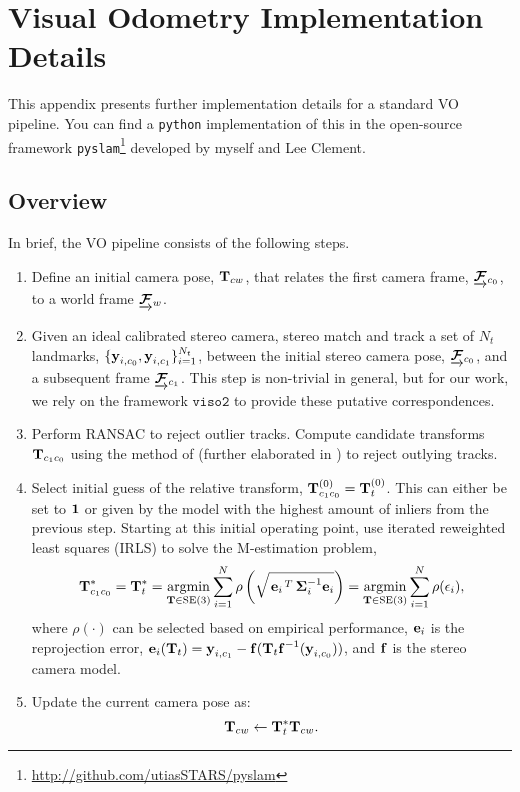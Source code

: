 \chapter{Visual Odometry Implementation Details}
\label{chap:appendix_vo}

This appendix presents further implementation details for a standard VO pipeline. You can find a \texttt{python} implementation of this in the open-source framework \texttt{pyslam}\footnote{\url{http://github.com/utiasSTARS/pyslam}} developed by myself and Lee Clement. 

\section{Overview}
In brief, the VO pipeline consists of the following steps.
\begin{enumerate}
\item Define an initial camera pose, $\boldsymbol{\mathbf{T}}_{cw}$, that relates the first camera frame, $\underrightarrow{ \boldsymbol{\mathbf{\mathcal{F}}} }_{c_0}$, to a world frame $\underrightarrow{ \boldsymbol{\mathbf{\mathcal{F}}} }_{w}$.
\item Given an ideal calibrated stereo camera, stereo match and track a set of $N_t$ landmarks, $\{\boldsymbol{\mathbf{y}}_{i, c_0}, \boldsymbol{\mathbf{y}}_{i, c_1}\}_{i=1}^{N_t}$, between the initial stereo camera pose, $\underrightarrow{ \boldsymbol{\mathbf{\mathcal{F}}} }_{c_0}$, and a subsequent frame $\underrightarrow{ \boldsymbol{\mathbf{\mathcal{F}}} }_{c_1}$. This step is non-trivial in general, but for our work, we rely on the framework $\texttt{viso2}$ to provide these putative correspondences.
\item Perform RANSAC to reject outlier tracks. Compute candidate transforms $\boldsymbol{\mathbf{T}}_{c_1c_0}$ using the method of \cite{Umeyama1991-ws} (further elaborated in \cite{Barfoot2017-ri}) to reject outlying tracks.
\item Select initial guess of the relative transform, $\boldsymbol{\mathbf{T}}_{c_1c_0}^{(0)} =  \boldsymbol{\mathbf{T}}_t^{(0)}$. This can either be set to $\boldsymbol{\mathbf{1}}$ or given by the model with the highest amount of inliers from the previous step. Starting at this initial operating point, use iterated reweighted least squares (IRLS) to solve the M-estimation problem,  
\begin{equation}
\label{eq:vo_app_robust_loss}
  \boldsymbol{\mathbf{T}}_{c_1c_0}^* = \boldsymbol{\mathbf{T}}_t^* = \operatorname*{argmin}_{\boldsymbol{\mathbf{T}}\in\text{SE}(3)}\sum_{i=1}^{N} 
  \rho\left(\sqrt{\left.{\boldsymbol{\mathbf{e}}_{i}}\right.^T \boldsymbol{\mathbf{\Sigma}}_{i}^{-1} \boldsymbol{\mathbf{e}}_{i}}\right) = \operatorname*{argmin}_{\boldsymbol{\mathbf{T}}\in\text{SE}(3)}\sum_{i=1}^{N} 
  \rho(\epsilon_i),
\end{equation}
where $\rho(\cdot)$ can be selected based on empirical performance, $\boldsymbol{\mathbf{e}}_i$ is the reprojection error, $\boldsymbol{\mathbf{e}}_{i}(\boldsymbol{\mathbf{T}}_t)  = \boldsymbol{\mathbf{y}}_{i, c_1} - \boldsymbol{\mathbf{f}}( \boldsymbol{\mathbf{T}}_t 
    \boldsymbol{\mathbf{f}}^{-1}( \boldsymbol{\mathbf{y}}_{i, c_0} ) )$, and $\boldsymbol{\mathbf{f}}$ is the stereo camera model.
\item Update the current camera pose as:
\begin{equation}
	\boldsymbol{\mathbf{T}}_{cw} \leftarrow  \boldsymbol{\mathbf{T}}_t^* \boldsymbol{\mathbf{T}}_{cw}.
\end{equation}
\end{enumerate}

